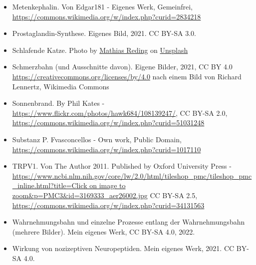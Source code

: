 \documentclass{beamer}
\begin{document}
\begin{frame}
\begin{tiny}
\begin{itemize}
\item
Metenkephalin. Von Edgar181 - Eigenes Werk, Gemeinfrei, \url{https://commons.wikimedia.org/w/index.php?curid=2834218}

\item
Prostaglandin-Synthese. Eigenes Bild, 2021. CC BY-SA 3.0.

\item
Schlafende Katze. Photo by \href{https://unsplash.com/@matreding?utm_source=unsplash&utm_medium=referral&utm_content=creditCopyText}{Mathias Reding} on \href{https://unsplash.com/s/photos/sleep?utm_source=unsplash&utm_medium=referral&utm_content=creditCopyText}{Unsplash}
  

\item
Schmerzbahn (und Ausschnitte davon). Eigene Bilder, 2021, CC BY 4.0 \url{https://creativecommons.org/licenses/by/4.0} nach einem Bild von Richard Lennertz,  Wikimedia Commons

\item
Sonnenbrand. By Phil Kates - \url{https://www.flickr.com/photos/hawk684/108139247/}, CC BY-SA 2.0, \url{https://commons.wikimedia.org/w/index.php?curid=51031248}

\item
Substanz P. Fvasconcellos - Own work, Public Domain, \url{https://commons.wikimedia.org/w/index.php?curid=1017110}

\item
TRPV1. Von The Author 2011. Published by Oxford University Press - \url{https://www.ncbi.nlm.nih.gov/core/lw/2.0/html/tileshop_pmc/tileshop_pmc_inline.html?title=Click on image to zoom&p=PMC3&id=3169333_aer26002.jpg}
CC BY-SA 2.5, \url{https://commons.wikimedia.org/w/index.php?curid=34131563}

\item
Wahrnehmungsbahn und einzelne Prozesse entlang der Wahrnehmungsbahn (mehrere Bilder). Mein eigenes Werk, CC BY-SA 4.0, 2022. 

\item
Wirkung von nozizeptiven Neuropeptiden. Mein eigenes Werk, 2021. CC BY-SA 4.0. 

\end{itemize}
\end{tiny}

\end{frame}
\end{document}
